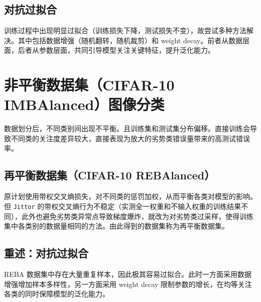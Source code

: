 \documentclass[a4paper]{article}
\begin{document}
\subsection{对抗过拟合}
训练过程中出现明显过拟合（训练损失下降，测试损失不变），故尝试多种方法解决。其中包括数据增强（随机翻转，随机裁剪）和 weight decay。前者从数据层面，后者从参数层面，共同引导模型关注关键特征，提升泛化能力。

\section{非平衡数据集（CIFAR-10 IMBAlanced）图像分类}
数据划分后，不同类别间出现不平衡。且训练集和测试集分布偏移。直接训练会导致不同类的关注度差异较大，直接表现为放大的劣势类错误量带来的高测试错误率。
\subsection{再平衡数据集（CIFAR-10 REBAlanced）}
原计划使用带权交叉熵损失，对不同类的惩罚加权，从而平衡各类对模型的影响。但 \texttt{Jittor} 的带权交叉熵行为不稳定（实测全一权重和不输入权重的训练结果不同），此外也避免劣势类异常点导致梯度爆炸，就改为对劣势类过采样，使得训练集中各类别的数据量相同的方法。由此得到的数据集称为再平衡数据集。

\subsection{重述：对抗过拟合}
REBA 数据集中存在大量重复样本，因此极其容易过拟合。此时一方面采用数据增强增加样本多样性，另一方面采用 weight decay 限制参数的增长，在均等关注各类的同时保障模型的泛化能力。
\end{document}
